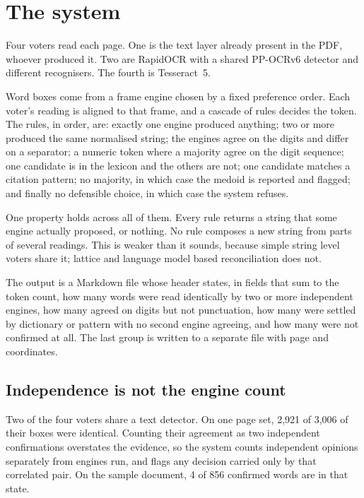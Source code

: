 \documentclass[11pt,a4paper]{article}
\begin{document}
\section{The system}

Four voters read each page. One is the text layer already present in the PDF, whoever
produced it. Two are RapidOCR with a shared PP-OCRv6 detector and different recognisers.
The fourth is Tesseract~5.

Word boxes come from a frame engine chosen by a fixed preference order. Each voter's
reading is aligned to that frame, and a cascade of rules decides the token. The rules, in
order, are: exactly one engine produced anything; two or more produced the same
normalised string; the engines agree on the digits and differ on a separator; a numeric
token where a majority agree on the digit sequence; one candidate is in the lexicon and
the others are not; one candidate matches a citation pattern; no majority, in which case
the medoid is reported and flagged; and finally no defensible choice, in which case the
system refuses.

One property holds across all of them. Every rule returns a string that some engine
actually proposed, or nothing. No rule composes a new string from parts of several
readings. This is weaker than it sounds, because simple string level voters share it;
lattice and language model based reconciliation does not.

The output is a Markdown file whose header states, in fields that sum to the token count,
how many words were read identically by two or more independent engines, how many agreed
on digits but not punctuation, how many were settled by dictionary or pattern with no
second engine agreeing, and how many were not confirmed at all. The last group is written
to a separate file with page and coordinates.

\subsection{Independence is not the engine count}
\label{sec:independence}

Two of the four voters share a text detector. On one page set, 2{,}921 of 3{,}006 of
their boxes were identical. Counting their agreement as two independent confirmations
overstates the evidence, so the system counts independent opinions separately from
engines run, and flags any decision carried only by that correlated pair. On the sample
document, 4 of 856 confirmed words are in that state.
\end{document}
